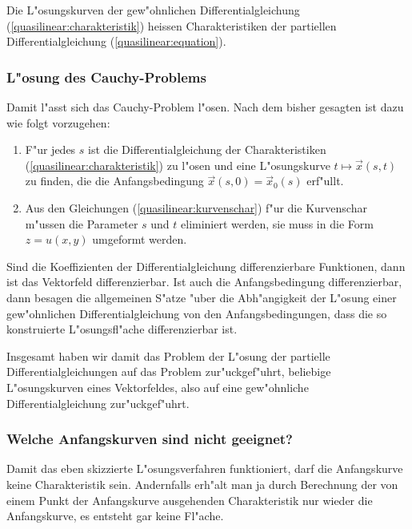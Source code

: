 \begin{definition}
\label{def:quasiliniear:charakteristik}
Die L"osungskurven der gew"ohnlichen Differentialgleichung
(\ref{quasilinear:charakteristik}) heissen Charakteristiken
der partiellen Differentialgleichung (\ref{quasilinear:equation}).
\end{definition}

\subsubsection{L"osung des Cauchy-Problems}
Damit l"asst sich das Cauchy-Problem l"osen.
Nach dem bisher gesagten ist dazu wie folgt vorzugehen:
\begin{enumerate}
\item
F"ur jedes $s$ ist die Differentialgleichung der Charakteristiken
(\ref{quasilinear:charakteristik}) zu l"osen und eine 
L"osungskurve $t\mapsto \vec x(s,t)$ zu finden, die
die Anfangsbedingung $\vec x(s,0)=\vec x_0(s)$ erf"ullt.
\item 
Aus den Gleichungen (\ref{quasilinear:kurvenschar}) f"ur die
Kurvenschar m"ussen die Parameter $s$ und $t$ eliminiert werden,
sie muss in die Form $z=u(x,y)$ umgeformt werden.
\end{enumerate}

Sind die Koeffizienten der Differentialgleichung differenzierbare Funktionen,
dann ist das Vektorfeld differenzierbar.
Ist auch die Anfangsbedingung differenzierbar,
dann besagen die allgemeinen S"atze "uber die Abh"angigkeit der L"osung einer
gew"ohnlichen Differentialgleichung von den Anfangsbedingungen, dass die so
konstruierte L"osungsfl"ache differenzierbar ist.

Insgesamt haben wir damit das Problem der L"osung der partielle Differentialgleichungen auf das Problem 
zur"uckgef"uhrt, beliebige L"osungskurven eines Vektorfeldes, also auf
eine gew"ohnliche Differentialgleichung zur"uckgef"uhrt.


\subsubsection{Welche Anfangskurven sind nicht geeignet?}
Damit das eben skizzierte L"osungsverfahren funktioniert, 
darf die Anfangskurve keine Charakteristik sein.
Andernfalls erh"alt man ja durch Berechnung der von einem Punkt
der Anfangskurve ausgehenden Charakteristik nur wieder die
Anfangskurve, es entsteht gar keine Fl"ache.

